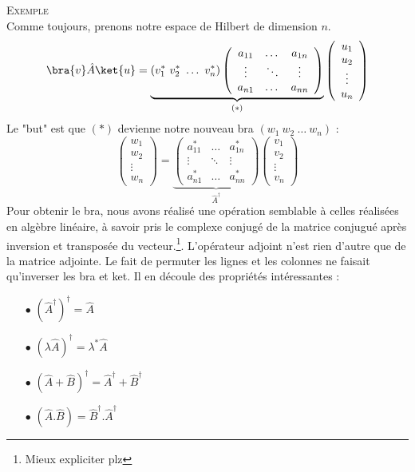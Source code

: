 \textsc{Exemple}\\
Comme toujours, prenons notre espace de Hilbert de dimension $n$.
\begin{equation}
\bra{v}\hat{A}\ket{u} = \underbrace{(v_1^*\ v_2^*\ \dots\ v_n^*)\left(\begin{array}{ccc}
a_{11} & \dots & a_{1n}\\
\vdots &\ddots &\vdots\\
a_{n1} & \dots & a_{nn}
\end{array}\right)}_{(*)}\left(\begin{array}{c}
u_1\\
u_2\\
\vdots\\
u_n
\end{array}\right)
\end{equation}
Le "but" est que $(*)$ devienne notre nouveau bra $(w_1\ w_2\ \dots\ w_n)$ :
\begin{equation}
\left(\begin{array}{c}
w_1\\
w_2\\
\vdots\\
w_n
\end{array}\right) = \underbrace{\left(\begin{array}{ccc}
a_{11}^* & \dots & a_{1n}^*\\
\vdots &\ddots &\vdots\\
a_{n1}^* & \dots & a_{nn}^*
\end{array}\right)}_{\hat{A}^\dagger}\left(\begin{array}{c}
v_1\\
v_2\\
\vdots\\
v_n
\end{array}\right)
\end{equation}
Pour obtenir le bra, nous avons réalisé une opération semblable à celles 
réalisées en algèbre linéaire, à savoir pris le complexe conjugé de la matrice 
conjugué après inversion et transposée du vecteur.\footnote{Mieux expliciter plz}.
L'opérateur adjoint n'est rien d'autre que de la matrice adjointe. Le fait 
de permuter les lignes et les colonnes ne faisait qu'inverser les bra et ket.
Il en découle des propriétés intéressantes :
\begin{multicols}{2}
\begin{itemize}
\item[$\bullet$] $\left(\hat{A}^\dagger\right)^\dagger = \hat{A}$
\item[$\bullet$] $\left(\lambda\hat{A}\right)^\dagger = \lambda^*\hat{A}$
\item[$\bullet$] $\left(\hat{A}+\hat{B}\right)^\dagger = \hat{A}^\dagger+\hat{B}^\dagger$
\item[$\bullet$] $\left(\hat{A}.\hat{B}\right) = \hat{B}^\dagger.\hat{A}^\dagger$
\end{itemize}
\end{multicols}
